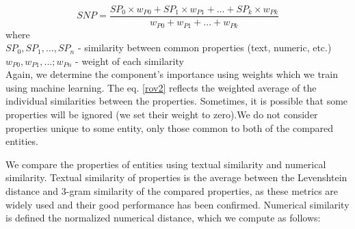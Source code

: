 \documentclass{llncs}
\begin{document}
\begin {equation}
SNP=\frac{SP_0 \times w_{P0} +SP_1 \times w_{P1} + ... +SP_k \times w_{Pk}}{w_{P0} + w_{P1} + ... + w_{Pk}}
\label{rov2}
\end {equation}
\newline
where\\
$SP_0, SP_1,...,  SP_n$ - similarity between common properties (text, numeric, etc.)\\
$w_{P0} , w_{P1} ,...; w_{Pn}$ - weight of each similarity\\
\newline
Again, we determine the component's importance using weights which we train
using machine learning. The eq. \ref{rov2} reflects the weighted average of the individual
similarities between the properties. Sometimes, it is possible that some properties
will be ignored (we set their weight to zero).We do not consider properties unique
to some entity, only those common to both of the compared entities.

We compare the properties of entities using textual similarity and numerical
similarity. Textual similarity of properties is the average between the Levenshtein
distance and 3-gram similarity of the compared properties, as these metrics
are widely used and their good performance has been confirmed. Numerical
similarity is defined the normalized numerical distance, which we compute as
follows:
\end{document}
